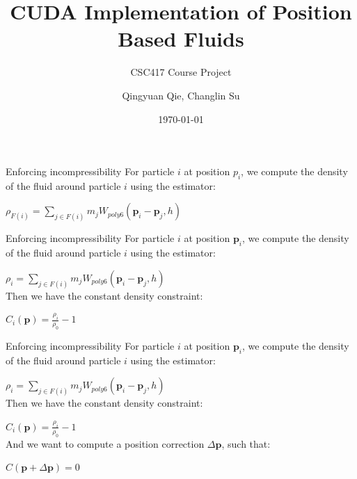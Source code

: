 \documentclass[aspectratio=169,xcolor=dvipsnames]{beamer}
\title[short title]{CUDA Implementation of Position Based Fluids} %
\subtitle{CSC417 Course Project}
\author[Qingyuan.Sheldon] {Qingyuan Qie, Changlin Su}
\institute[UofT] %
{
    Department of Computer Science \\
    University of Toronto
}
\date{\today} %
\newcommand{\vect}[1]{\boldsymbol{#1}}
\begin{document}
\begin{frame}
    \titlepage
\end{frame}


\begin{frame}{Enforcing incompressibility}
    For particle $i$ at position $p_i$, we compute the density of the fluid around particle $i$ using the estimator:
    
  $\rho_{F(i)} = \sum_{j \in F(i)} m_j W_{poly6}(\vect{p}_i - \vect{p}_j, h)$
    
\end{frame}

\begin{frame}{Enforcing incompressibility}
    For particle $i$ at position $\vect{p}_i$, we compute the density of the fluid around particle $i$ using the estimator:
    
  $\rho_{i} = \sum_{j \in F(i)} m_j W_{poly6}(\vect{p}_i - \vect{p}_j, h)$ \\[2ex]
  Then we have the constant density constraint:

  $C_i(\vect{p}) = \frac{\rho_i}{\rho_0} - 1$ \\[2ex]

\end{frame}

\begin{frame}{Enforcing incompressibility}
    For particle $i$ at position $\vect{p}_i$, we compute the density of the fluid around particle $i$ using the estimator:
    
  $\rho_{i} = \sum_{j \in F(i)} m_j W_{poly6}(\vect{p}_i - \vect{p}_j, h)$ \\[2ex]
  Then we have the constant density constraint:

  $C_i(\vect{p}) = \frac{\rho_i}{\rho_0} - 1$ \\[2ex]

  And we want to compute a position correction $\Delta \vect{p}$, such that:

  $C(\vect{p} + \Delta \vect{\vect{p}}) = 0$
    
\end{frame}
\end{document}
